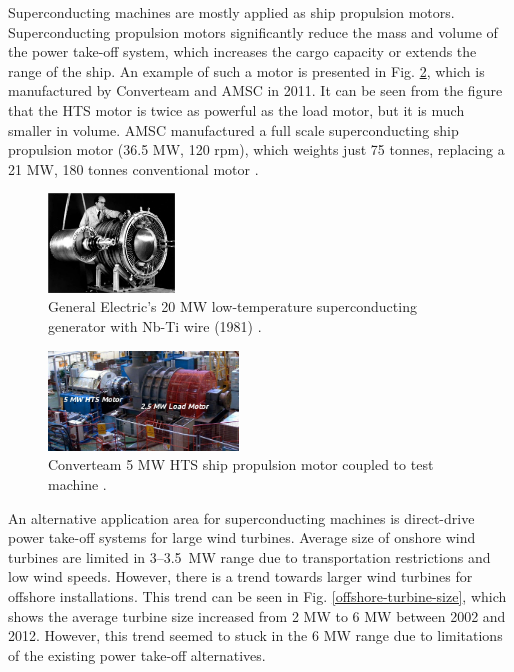 \documentclass[12pt]{IET02}
\begin{document}
Superconducting machines are mostly applied as ship propulsion motors. Superconducting propulsion motors significantly reduce the mass and volume of the power take-off system, which increases the cargo capacity or extends the range of the ship. An example of such a motor is presented in Fig. \ref{converteam_5MW}, which is manufactured by Converteam and AMSC in 2011. It can be seen from the figure that the HTS motor is twice as powerful as the load motor, but it is much smaller in volume. AMSC manufactured a full scale superconducting ship propulsion motor (36.5 MW, 120 rpm), which weights just 75 tonnes, replacing a 21 MW, 180 tonnes conventional motor \cite{Gamble2011}.

  \begin{figure}[]
    \centering
    \includegraphics[width=0.3\textwidth]{GE_LTS_machine}
    \caption{General Electric's 20 MW low-temperature superconducting generator with Nb-Ti wire (1981) \cite{Barnes2005}.} 
    \label{GE_LTS_machine}
  \end{figure}

  \begin{figure}[]
    \centering
    \includegraphics[width=0.45\textwidth]{converteam_5MW}
    \caption{Converteam 5 MW HTS ship propulsion motor coupled to test machine  \cite{Kalsi2004h}.} 
    \label{converteam_5MW}
  \end{figure}

An alternative application area for superconducting machines is direct-drive power take-off systems for large wind turbines. Average size of onshore wind turbines are limited in 3--3.5~MW range due to transportation restrictions and low wind speeds. However, there is a trend towards larger wind turbines for offshore installations. This trend can be seen in Fig. \ref{offshore-turbine-size}, which shows the average turbine size increased from 2 MW to 6 MW between 2002 and 2012. However, this trend seemed to stuck in the 6 MW range due to limitations of the existing power take-off alternatives. 
\end{document}
